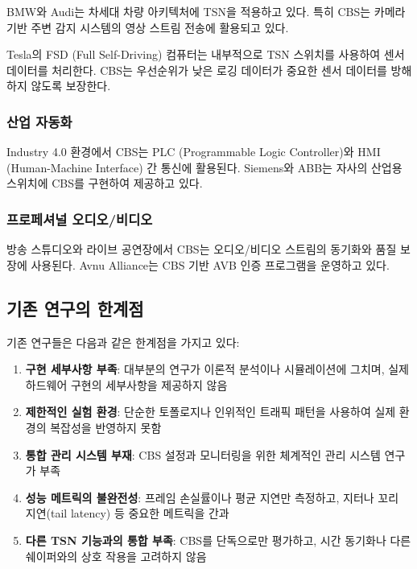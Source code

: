 \documentclass[twocolumn,10pt]{article}
\begin{document}
BMW와 Audi는 차세대 차량 아키텍처에 TSN을 적용하고 있다\cite{bmw2022tsn}. 특히 CBS는 카메라 기반 주변 감지 시스템의 영상 스트림 전송에 활용되고 있다.

Tesla의 FSD (Full Self-Driving) 컴퓨터는 내부적으로 TSN 스위치를 사용하여 센서 데이터를 처리한다\cite{tesla2023fsd}. CBS는 우선순위가 낮은 로깅 데이터가 중요한 센서 데이터를 방해하지 않도록 보장한다.

\subsubsection{산업 자동화}

Industry 4.0 환경에서 CBS는 PLC (Programmable Logic Controller)와 HMI (Human-Machine Interface) 간 통신에 활용된다\cite{siemens2022tsn}. Siemens와 ABB는 자사의 산업용 스위치에 CBS를 구현하여 제공하고 있다.

\subsubsection{프로페셔널 오디오/비디오}

방송 스튜디오와 라이브 공연장에서 CBS는 오디오/비디오 스트림의 동기화와 품질 보장에 사용된다\cite{avnu2023whitepaper}. Avnu Alliance는 CBS 기반 AVB 인증 프로그램을 운영하고 있다.

\subsection{기존 연구의 한계점}

기존 연구들은 다음과 같은 한계점을 가지고 있다:

\begin{enumerate}
    \item \textbf{구현 세부사항 부족}: 대부분의 연구가 이론적 분석이나 시뮬레이션에 그치며, 실제 하드웨어 구현의 세부사항을 제공하지 않음
    
    \item \textbf{제한적인 실험 환경}: 단순한 토폴로지나 인위적인 트래픽 패턴을 사용하여 실제 환경의 복잡성을 반영하지 못함
    
    \item \textbf{통합 관리 시스템 부재}: CBS 설정과 모니터링을 위한 체계적인 관리 시스템 연구가 부족
    
    \item \textbf{성능 메트릭의 불완전성}: 프레임 손실률이나 평균 지연만 측정하고, 지터나 꼬리 지연(tail latency) 등 중요한 메트릭을 간과
    
    \item \textbf{다른 TSN 기능과의 통합 부족}: CBS를 단독으로만 평가하고, 시간 동기화나 다른 쉐이퍼와의 상호 작용을 고려하지 않음
\end{enumerate}
\end{document}
